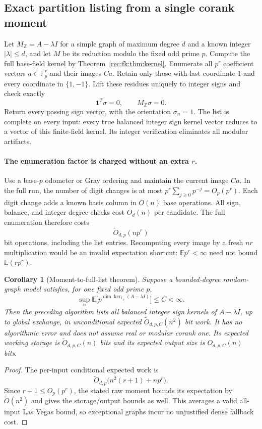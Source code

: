 \documentclass[11pt]{article}
\newtheorem{corollary}[theorem]{Corollary}
\theoremstyle{definition}
\theoremstyle{remark}
\newcommand{\E}{\mathbb E}
\newcommand{\1}{\mathbf 1}
\providecommand{\one}{\mathbf 1}
\providecommand{\F}{\mathbb F}
\begin{document}
\subsection{Exact partition listing from a single corank moment}
Let $M_{\mathbb Z}=A-\lambda I$ for a simple graph of maximum degree
$d$ and a known integer $|\lambda|\le d$, and let $M$ be its reduction modulo
the fixed odd prime $p$. Compute the full base-field kernel by
Theorem~\ref{rec:fk:thm:kernel}. Enumerate all $p^r$ coefficient vectors
$a\in\F_p^r$ and their images $Ca$.
Retain only those with last coordinate $1$ and every coordinate in
$\{1,-1\}$. Lift these residues uniquely to integer signs and
check exactly
\[
 \one^T\sigma=0,\qquad M_{\mathbb Z}\sigma=0.
\]
Return every passing sign vector, with the orientation $\sigma_n=1$.
The list is complete on every input: every true balanced integer
sign kernel vector reduces to a vector of this finite-field kernel.
Its integer verification eliminates all modular artifacts.

\paragraph{The enumeration factor is charged without an extra $r$.}
Use a base-$p$ odometer or Gray ordering and maintain the current
image $Ca$. In the full run, the number of digit changes is at most
$p^r\sum_{j\ge0}p^{-j}=O_p(p^r)$.
Each digit change adds a known basis column in $O(n)$ base operations.
All sign, balance, and integer degree checks cost $O_d(n)$ per
candidate. The full enumeration therefore costs
\[
 \widetilde O_{d,p}(n p^r)
\]
bit operations, including the list entries. Recomputing every image
by a fresh $nr$ multiplication would be an invalid expectation
shortcut: $\E p^r<\infty$ need not bound $\E(rp^r)$.

\begin{corollary}[Moment-to-full-list theorem]\label{rec:fk:cor:moment}
Suppose a bounded-degree random-graph model satisfies, for one fixed
odd prime $p$,
\[
 \sup_n\E\bigl[p^{\dim\ker_{\F_p}(A-\lambda I)}\bigr]\le C<\infty.
\]
Then the preceding algorithm lists all balanced integer sign kernels
of $A-\lambda I$, up to global exchange, in unconditional expected
$\widetilde O_{d,p,C}(n^2)$ bit work. It has no algorithmic error
and does not assume real or modular corank one. Its expected working
storage is $\widetilde O_{d,p,C}(n)$ bits and its expected output
size is $O_{d,p,C}(n)$ bits.
\end{corollary}
\begin{proof}
The per-input conditional expected work is
\[
 \widetilde O_{d,p}\bigl(n^2(r+1)+n p^r\bigr).
\]
Since $r+1\le O_p(p^r)$, the stated raw moment bounds its expectation
by $\widetilde O(n^2)$ and gives the storage/output bounds as well.
This averages a valid all-input Las Vegas bound, so exceptional
graphs incur no unjustified dense fallback cost.
\end{proof}
\end{document}
